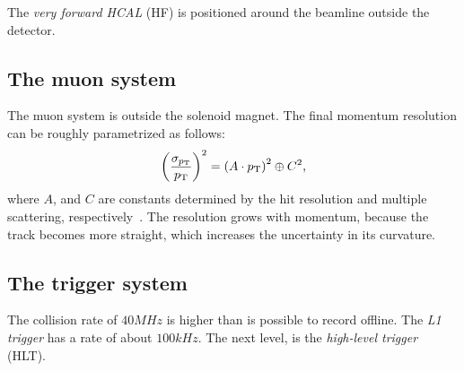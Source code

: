The \emph{very forward HCAL} (HF) is positioned around the beamline outside the detector.

\subsection{The muon system}
The muon system is outside the solenoid magnet.
The final momentum resolution can be roughly parametrized as follows:
\begin{equation}
  \left(\frac{\sigma_{p_\text{T}}}{p_\text{T}}\right)^2 = \left(A\cdot p_\text{T}\right)^2 \oplus C^2,
\end{equation}
where $A$, and $C$ are constants determined by the hit resolution and multiple scattering, respectively~\cite{CMS_muon_resolution_thesis}. The resolution grows with momentum, because the track becomes more straight, which increases the uncertainty in its curvature.

\subsection{The trigger system}\label{sec:trigger}
The collision rate of $40\unit{MHz}$ is higher than is possible to record offline.
The \emph{L1 trigger} has a rate of about $100\unit{kHz}$.
The next level, is the \emph{high-level trigger} (HLT).


